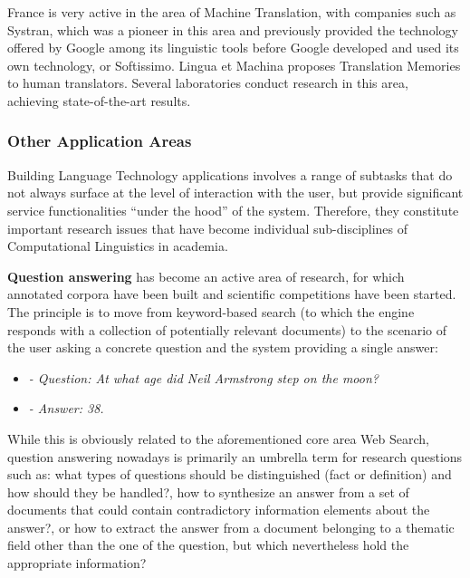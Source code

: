 \begin{multicols}{2}
France is very active in the area of Machine Translation, with
companies such as Systran, which was a pioneer in this area and
previously provided the technology offered by Google among its
linguistic tools before Google developed and used its own technology,
or Softissimo. Lingua et Machina proposes Translation Memories to
human translators. Several laboratories conduct research in this
area, achieving state-of-the-art results.

\subsubsection{Other Application Areas}

Building Language Technology applications involves a range of subtasks
that do not always surface at the level of interaction with the user,
but provide significant service functionalities ``under the hood'' of
the system. Therefore, they constitute important research issues that
have become individual sub-disciplines of Computational Linguistics in
academia.

{\bf Question answering} has become an active area of research, for
which annotated corpora have been built and scientific competitions
have been started. The principle is to move from keyword-based search
(to which the engine responds with a collection of potentially
relevant documents) to the scenario of the user asking a concrete
question and the system providing a single answer:

\begin{itemize}
\item[] \textit{- Question: At what age did Neil Armstrong step on the moon?}
\item[] \textit{- Answer: 38.}
\end{itemize}

While this is obviously related to the aforementioned core area
Web Search, question answering nowadays is primarily an umbrella term
for research questions such as: what types of questions should be
distinguished (fact or definition) and how should they be handled?, how
to synthesize an answer from a set of documents that could contain
contradictory information elements about the answer?, or how to extract
the answer from a document belonging to a thematic field other than
the one of the question, but which nevertheless hold the appropriate
information?


\end{multicols}
